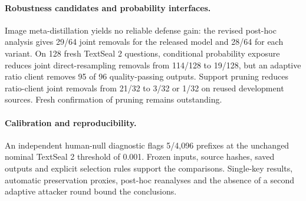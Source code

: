 \paragraph{Robustness candidates and probability interfaces.}
Image meta-distillation yields no reliable defense gain: the revised post-hoc analysis gives 29/64 joint removals for the released model and 28/64 for each variant. On 128 fresh TextSeal 2 questions, conditional probability exposure reduces joint direct-resampling removals from 114/128 to 19/128, but an adaptive ratio client removes 95 of 96 quality-passing outputs. Support pruning reduces ratio-client joint removals from 21/32 to 3/32 or 1/32 on reused development sources. Fresh confirmation of pruning remains outstanding.

\paragraph{Calibration and reproducibility.}
An independent human-null diagnostic flags 5/4,096 prefixes at the unchanged nominal TextSeal 2 threshold of 0.001. Frozen inputs, source hashes, saved outputs and explicit selection rules support the comparisons. Single-key results, automatic preservation proxies, post-hoc reanalyses and the absence of a second adaptive attacker round bound the conclusions.
